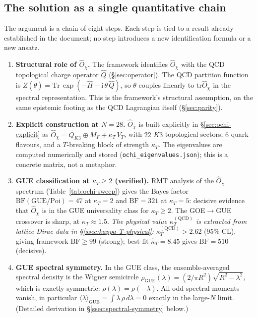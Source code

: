 \documentclass[11pt,a4paper]{article}
\newcommand{\Opchi}{\hat{O}_\chi}
\providecommand{\ii}{}
\renewcommand{\ii}{\mathrm{i}}
\providecommand{\tr}{}
\renewcommand{\tr}{\mathrm{tr}}
\theoremstyle{plain}
\theoremstyle{definition}
\theoremstyle{remark}
\begin{document}
\subsection{The solution as a single quantitative chain}
\label{ssec:cp-chain}

The argument is a chain of eight steps.  Each step is tied to a result
already established in the document; no step introduces a new
identification formula or a new ansatz.

\begin{enumerate}[leftmargin=2em,itemsep=4pt]
  \item \textbf{Structural role of $\Opchi$.}  The framework
        identifies $\Opchi$ with the QCD topological charge operator
        $\hat Q$ (\S\ref{sec:operator}).  The QCD partition function
        is $Z(\bar\theta) = \mathrm{Tr}\,\exp(-\hat H + \ii\,\bar\theta\,\hat Q)$,
        so $\bar\theta$ couples linearly to $\tr\Opchi$ in the
        spectral representation.  This is the framework's structural
        assumption, on the same epistemic footing as the QCD
        Lagrangian itself (\S\ref{sec:parity}).

  \item \textbf{Explicit construction at $N=28$.}  $\Opchi$ is built
        explicitly in \S\ref{sec:ochi-explicit} as
        $\Opchi = Q_{K3} \oplus M_F + \kappa_T\,V_T$, with $22$ $K3$
        topological sectors, $6$ quark flavours, and a $T$-breaking
        block of strength $\kappa_T$.  The eigenvalues are computed
        numerically and stored (\texttt{ochi\_eigenvalues.json}); this
        is a concrete matrix, not a metaphor.

  \item \textbf{GUE classification at $\kappa_T \ge 2$ (verified).}
        RMT analysis of the $\Opchi$ spectrum
        (Table~\ref{tab:ochi-sweep}) gives the Bayes factor
        $\mathrm{BF}(\mathrm{GUE}/\mathrm{Poi}) = 47$ at $\kappa_T = 2$
        and $\mathrm{BF} = 321$ at $\kappa_T = 5$: decisive evidence
        that $\Opchi$ is in the GUE universality class for
        $\kappa_T \ge 2$.  The GOE$\to$GUE crossover is sharp, at
        $\kappa_T \approx 1.5$.  \emph{The physical value
        $\kappa_T^{(\mathrm{QCD})}$ is extracted from lattice Dirac
        data in \S\ref{ssec:kappa-T-physical}:}
        $\kappa_T^{(\mathrm{QCD})} > 2.62$ (95\% CL), giving framework
        $\mathrm{BF} \ge 99$ (strong); best-fit
        $\hat\kappa_T = 8.45$ gives $\mathrm{BF} = 510$ (decisive).

  \item \textbf{GUE spectral symmetry.}  In the GUE class, the
        ensemble-averaged spectral density is the Wigner semicircle
        $\rho_{\mathrm{GUE}}(\lambda) = (2/\pi R^2)\sqrt{R^2 -
        \lambda^2}$, which is exactly symmetric:
        $\rho(\lambda) = \rho(-\lambda)$.  All odd spectral moments
        vanish, in particular
        $\langle\lambda\rangle_{\mathrm{GUE}} = \int \lambda\,\rho\,d\lambda = 0$
        exactly in the large-$N$ limit.  (Detailed derivation in
        \S\ref{ssec:spectral-symmetry} below.)


\end{enumerate}
\end{document}
